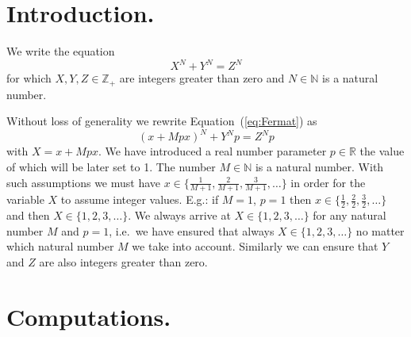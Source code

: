 \documentclass{article}
\begin{document}



\section{Introduction.}

We write the equation
\begin{equation}
\label{eq:Fermat}
X^N + Y^N = Z^N
\end{equation}
for which
$X, Y, Z \in \mathbb{Z_{+}}$ are integers
greater than zero
and $N \in \mathbb{N}$ is a natural number.

Without loss of generality we rewrite Equation~(\ref{eq:Fermat}) as
\begin{equation}
\label{eq:FermatEquation}
(x + Mpx)^N + Y^N p = Z^N p
\end{equation}
with $X=x + Mpx$.
We have introduced a real number parameter $p \in \mathbb{R}$ the value of which will be later set to 1\@.
The number $M \in \mathbb{N}$ is a natural number.
With such assumptions we must have $x \in \{ \frac{1}{M+1}, \frac{2}{M+1}, \frac{3}{M+1}, \ldots \}$
in order for the variable $X$ to assume integer values.
E.g.: if $M=1$, $p=1$ then $x \in \{ \frac{1}{2}, \frac{2}{2}, \frac{3}{2}, \ldots \}$
and then $X \in \{1, 2, 3, \ldots \}$\@.
We always arrive at $X \in \{1, 2, 3, \ldots \}$ for any natural number $M$ and $p=1$,
i.e.~we have ensured that always $X \in \{1, 2, 3, \ldots \}$ no matter which natural number $M$ we take
into account. Similarly we can ensure that $Y$ and $Z$ are also integers greater than zero.


\section{Computations.}
\end{document}
